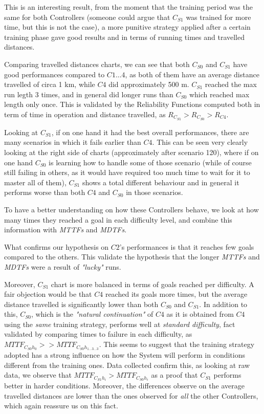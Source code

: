 This is an interesting result, from the moment that the training period was the same for both Controllers (someone could argue that $C_{S1}$ was trained for more time, but this is not the case), a more punitive strategy applied after a certain training phase gave good results and in terms of running times and travelled distances.
\newline

Comparing travelled distances charts, we can see that both $C_{S0}$ and $C_{S1}$ have good performances compared to $C1\dots 4$, as both of them have an average distance travelled of circa 1 km, while $C4$ did approximately 500 m. $C_{S1}$ reached the max run legth 3 times, and in general did longer runs than $C_{S0}$ which reached max length only once.
This is validated by the Reliability Functions computed both in term of time in operation and distance travelled, as $R_{C_{S1}} > R_{C_{S0}} > R_{C4}$.

Looking at $C_{S1}$, if on one hand it had the best overall performances, there are many scenarios in which it fails earlier than $C4$. This can be seen very clearly looking at the right side of charts (approximately after scenario 120), where if on one hand $C_{S0}$ is learning how to handle some of those scenario (while of course still failing in others, as it would have required too much time to wait for it to master all of them), $C_{S1}$ shows a total different behaviour and in general it performs worse than both $C4$ and $C_{S0}$ in those scenarios.


To have a better understanding on how these Controllers behave, we look at how many times they reached a goal in each difficulty level, and combine this information with \textsl{MTTFs} and \textsl{MDTFs}.

What confirms our hypothesis on $C2$'s performances is that it reaches few goals compared to the others. This validate the hypothesis that the longer \textsl{MTTFs} and \textsl{MDTFs} were a result of \textsl{"lucky"} runs.

Moreover, $C_{S1}$ chart is more balanced in terms of goals reached per difficulty. A fair objection would be that $C4$ reached its goals more times, but the average distance travelled is significantly lower than both $C_{S0}$ and $C_{S1}$. In addition to this, $C_{S0}$, which is the \textsl{"natural continuation"} of $C4$ as it is obtained from $C4$ using the \textsl{same} training strategy, performs well at \textsl{standard difficulty}, fact validated by comparing times to failure in each difficulty, as $MTTF_{C_{S0}h_{0}} >> MTTF_{C_{S0}h_{1\dots 3\dots 3}}$.
This seems to suggest that the training strategy adopted has a strong influence on how the System will perform in conditions different from the training ones. Data collected confirm this, as looking at raw data, we observe that $MTTF_{C_{S1}h_{i}} > MTTF_{C_{S0}h_{i}}$ as a proof that $C_{S1}$ performs better in harder conditions. Moreover, the differences observe on the average travelled distances are lower than the ones observed for \textsl{all} the other Controllers, which again reassure us on this fact.

